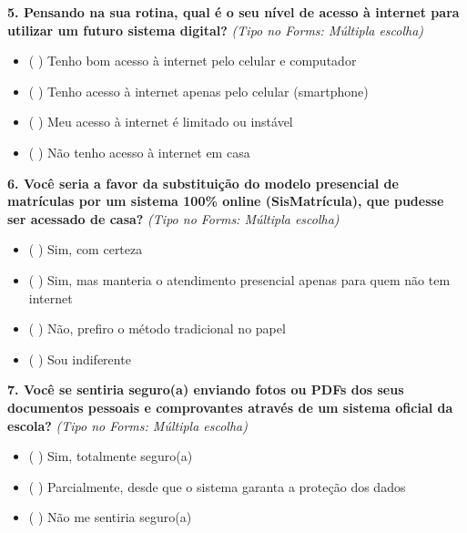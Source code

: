 \documentclass[12pt,a4paper]{article}
\begin{document}
\vspace{0.2cm}

\noindent \textbf{5. Pensando na sua rotina, qual é o seu nível de acesso à internet para utilizar um futuro sistema digital?} \textit{(Tipo no Forms: Múltipla escolha)}

\begin{itemize}[leftmargin=1.0cm, noitemsep]

    \item ( ) Tenho bom acesso à internet pelo celular e computador

    \item ( ) Tenho acesso à internet apenas pelo celular (smartphone)

    \item ( ) Meu acesso à internet é limitado ou instável

    \item ( ) Não tenho acesso à internet em casa

\end{itemize}

\vspace{0.2cm}

\noindent \textbf{6. Você seria a favor da substituição do modelo presencial de matrículas por um sistema 100\% online (SisMatrícula), que pudesse ser acessado de casa?} \textit{(Tipo no Forms: Múltipla escolha)}

\begin{itemize}[leftmargin=1.0cm, noitemsep]

    \item ( ) Sim, com certeza

    \item ( ) Sim, mas manteria o atendimento presencial apenas para quem não tem internet

    \item ( ) Não, prefiro o método tradicional no papel

    \item ( ) Sou indiferente

\end{itemize}

\vspace{0.2cm}

\noindent \textbf{7. Você se sentiria seguro(a) enviando fotos ou PDFs dos seus documentos pessoais e comprovantes através de um sistema oficial da escola?} \textit{(Tipo no Forms: Múltipla escolha)}

\begin{itemize}[leftmargin=1.0cm, noitemsep]

    \item ( ) Sim, totalmente seguro(a)

    \item ( ) Parcialmente, desde que o sistema garanta a proteção dos dados

    \item ( ) Não me sentiria seguro(a)

\end{itemize}
\end{document}
